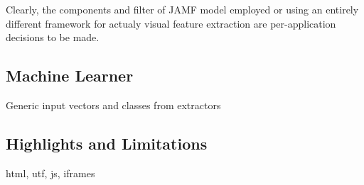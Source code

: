 Clearly, the components and filter of JAMF model employed or using an entirely different framework for actualy visual feature extraction are per-application decisions to be made.


\subsection{Machine Learner}

Generic input vectors and classes from extractors

\subsection{\label{sec:limitations}Highlights and Limitations}

html, utf, js, iframes
